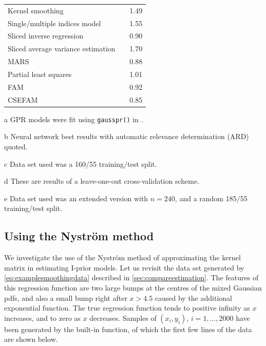\documentclass[showframe,11pt,twoside,openright]{report}\usepackage[]{graphicx}\usepackage{xcolor}
\begin{document}
\begin{table}[htbp]
\begin{threeparttable}
\begin{tabular}{p{7cm}rr}
\hspace{0.5em} Kernel smoothing\tnote{c}                   && 1.49 \\
\hspace{0.5em} Single/multiple indices model\tnote{d}      && 1.55
\\[0.5em]
\hspace{0.5em} Sliced inverse regression                   && 0.90 \\
\hspace{0.5em} Sliced average variance estimation          && 1.70 \\
\hspace{0.5em} MARS\tnote{e}                               && 0.88
\\[0.5em]
\hspace{0.5em} Partial least squares\tnote{e}              && 1.01 \\
\hspace{0.5em} FAM\tnote{e}                                && 0.92 \\
\hspace{0.5em} CSEFAM\tnote{e}                             && 0.85 \\
\bottomrule
\end{tabular}
\begin{tablenotes}\footnotesize
\item [a] GPR models were fit using \texttt{gausspr()} in .
\item [b] Neural network best results with automatic relevance determination (ARD) quoted.
\item [c] Data set used was a 160/55 training/test split.
\item [d] These are results of a leave-one-out cross-validation scheme.
\item [e] Data set used was an extended version with $n=240$, and a random 185/55 training/test split.
\end{tablenotes}
\end{threeparttable}
\end{table}

\subsection{Using the Nyström method}

We investigate the use of the Nystr\"om method of approximating the kernel matrix in estimating I-prior models.
Let us revisit the data set generated by \cref{eq:examplesmoothingdata} described in \cref{sec:compareestimation}.
The features of this regression function are two large bumps at the centres of the mixed Gaussian pdfs, and also a small bump right after $x>4.5$ caused by the additional exponential function.
The true regression function tends to positive infinity as $x$ increases, and to zero as $x$ decreases.
Samples of $(x_i,y_i)$, $i=1,\dots,2000$ have been generated by the built-in  function, of which the first few lines of the data are shown below.
\end{document}
